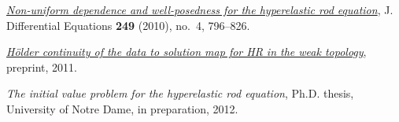 \documentclass[12pt]{article}
\begin{document}
\large
\begin{thebibliography}{1}

  \href{http://davidkarapetyan.com/pdfs/hr-nud-2010.pdf}{\emph{Non-uniform dependence and well-posedness for the
  hyperelastic rod equation}}, J. Differential Equations \textbf{249} (2010),
  no.~4, 796--826.

  \href{http://davidkarapetyan.com/pdfs/hr_holder_cont.pdf}{\emph{H\"older continuity of the data to solution map for HR in the weak topology}}, preprint,
  2011.

\emph{The initial value problem for the hyperelastic rod equation},
  Ph.D. thesis, University of Notre Dame, in preparation, 2012.

\end{thebibliography}
        
        
\end{document}
